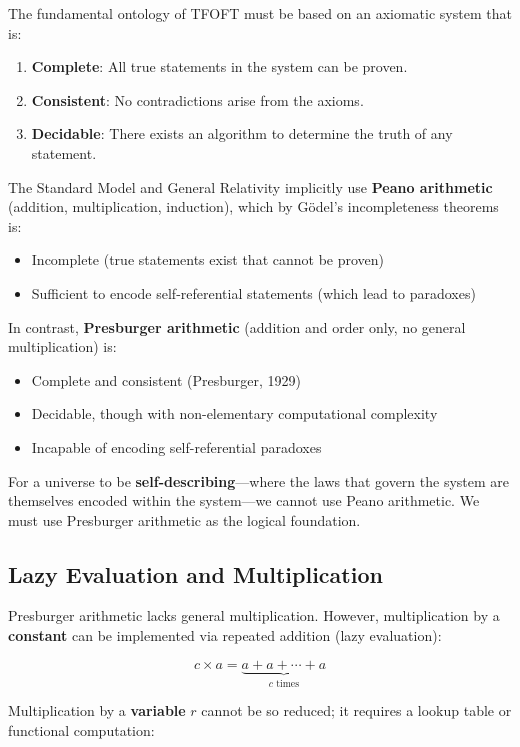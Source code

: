 \documentclass[11pt,a4paper]{article}
\begin{document}
  The fundamental ontology of TFOFT must be based on an axiomatic system that is:
  \begin{enumerate}
  \item \textbf{Complete}: All true statements in the system can be proven.
  \item \textbf{Consistent}: No contradictions arise from the axioms.
  \item \textbf{Decidable}: There exists an algorithm to determine the truth of any statement.
  \end{enumerate}

  The Standard Model and General Relativity implicitly use \textbf{Peano arithmetic} (addition, multiplication, induction), which by Gödel's incompleteness theorems is:
  \begin{itemize}
  \item Incomplete (true statements exist that cannot be proven)
  \item Sufficient to encode self-referential statements (which lead to paradoxes)
  \end{itemize}

  In contrast, \textbf{Presburger arithmetic} (addition and order only, no general multiplication) is:
  \begin{itemize}
  \item Complete and consistent (Presburger, 1929)
  \item Decidable, though with non-elementary computational complexity
  \item Incapable of encoding self-referential paradoxes
  \end{itemize}

  For a universe to be \textbf{self-describing}—where the laws that govern the system are themselves encoded within the system—we cannot use Peano arithmetic. We must use Presburger arithmetic as the logical foundation.

  \subsection{Lazy Evaluation and Multiplication}

  Presburger arithmetic lacks general multiplication. However, multiplication by a \textbf{constant} can be implemented via repeated addition (lazy evaluation):

  \[
  c \times a = \underbrace{a + a + \cdots + a}_{c \text{ times}}
  \]

  Multiplication by a \textbf{variable} $r$ cannot be so reduced; it requires a lookup table or functional computation:
\end{document}
